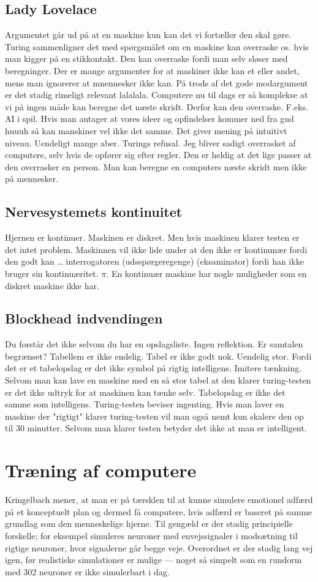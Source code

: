 \documentclass{article}
\begin{document}
\subsection{Lady Lovelace}
Argumentet går ud på at en maskine kun kan det vi fortæller den skal gøre. Turing sammenligner det med spørgsmålet om en maskine kan overraske os. hvis man kigger på en stikkontakt. Den kan overraske fordi man selv sløser med beregninger.
Der er mange argumenter for at maskiner ikke kan et eller andet, mens man ignorerer at mnennesker ikke kan.
På trods af det gode modargument er det stadig rimeligt relevant lalalala.
Computere nu til dags er så komplekse at vi på ingen måde kan beregne det næste skridt. Derfor kan den overraske. F.eks. AI i spil.
Hvis man antager at vores ideer og opfindelser kommer ned fra gud huuuh så kan manskiner vel ikke det samme.
Det giver mening på intuitivt niveau.
Uendeligt mange aber.
Turings refusal. Jeg bliver sadigt overrasket af computere, selv hvis de opfører sig efter regler. Den er heldig at det lige passer at den overrasker en person.
Man kan beregne en computers næste skridt men ikke på mennesker.

\subsection{Nervesystemets kontinuitet}
Hjernen er kontinuer. Maskinen er diskret. Men hvis maskinen klarer testen er det intet problem.
Maskinnen vil ikke lide under at den ikke er kontinunær fordi den godt kan … interrogatoren (udsspørgeregenge) (eksaminator) fordi han ikke bruger sin  kontinuæritet. $\pi$. En kontinuær maskine har nogle muligheder som en diskret maskine ikke har.

\subsection{Blockhead indvendingen}
Du forstår det ikke selvom du har en opslagsliste. Ingen reflektion. 
Er samtalen begrænset? Tabellem er ikke endelig. Tabel er ikke godt nok. Uendelig stor. Fordi det er et tabelopslag er det ikke symbol på rigtig intelligens. Imitere tænkning.
Selvom man kan lave en maskine med en så stor tabel at den klarer turing-testen er det ikke udtryk for at maskinen kan tænke selv. Tabelopslag er ikke det samme som intelligens. Turing-testen beviser ingenting.
Hvis man laver en maskine der "rigtigt" klarer turing-testen vil man også nemt kun skalere den op til 30 minutter.
Selvom man klarer testen betyder det ikke at man er intelligent.


\section{Træning af computere}
Kringelbach mener, at man er på tærsklen til at kunne simulere emotionel adfærd på et konceptuelt plan og dermed få computere, hvis adfærd er baseret på samme grundlag som den menneskelige hjerne. Til gengæld er der stadig principielle forskelle; for eksempel simuleres neuroner med envejssignaler i modsætning til rigtige neuroner, hvor signalerne går begge veje. Overordnet er der stadig lang vej igen, før realistiske simulationer er mulige --- noget så simpelt som en rundorm med 302 neuroner er ikke simulerbart i dag.
\end{document}
